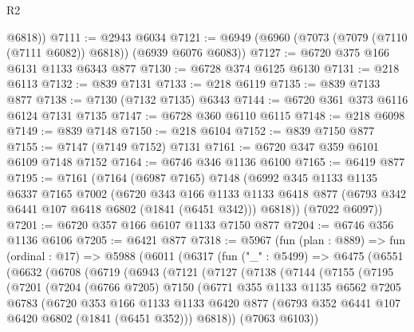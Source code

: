 \begin{lexlean}{R2}
\begin{coremodule}
        @6818))
@7111 := @2943 @6034
@7121 := @6949 (@6960 (@7073 (@7079 (@7110 (@7111 @6082)) @6818)) (@6939 @6076 @6083))
@7127 := @6720 @375 @166 @6131 @1133 @6343 @877
@7130 := @6728 @374 @6125 @6130
@7131 := @218 @6113
@7132 := @839 @7131
@7133 := @218 @6119
@7135 := @839 @7133 @877
@7138 := @7130 (@7132 @7135) @6343
@7144 := @6720 @361 @373 @6116 @6124 @7131 @7135
@7147 := @6728 @360 @6110 @6115
@7148 := @218 @6098
@7149 := @839 @7148
@7150 := @218 @6104
@7152 := @839 @7150 @877
@7155 := @7147 (@7149 @7152) @7131
@7161 := @6720 @347 @359 @6101 @6109 @7148 @7152
@7164 := @6746 @346 @1136 @6100
@7165 := @6419 @877
@7195 := @7161
    (@7164
      (@6987 @7165)
      @7148
      (@6992
        @345
        @1133
        @1135
        @6337
        @7165
        @7002
        (@6720
          @343
          @166
          @1133
          @1133
          @6418
          @877
          (@6793 @342 @6441 @107 @6418 @6802 (@1841 (@6451 @342)))
          @6818))
      (@7022 @6097))
@7201 := @6720 @357 @166 @6107 @1133 @7150 @877
@7204 := @6746 @356 @1136 @6106
@7205 := @6421 @877
@7318 := @5967
    (fun (plan : @889) =>
    fun (ordinal : @17) =>
    @5988
      (@6011
        (@6317
          (fun ("_" : @5499) =>
          @6475
            (@6551
              (@6632
                (@6708
                  (@6719
                    (@6943
                      (@7121
                        (@7127
                          (@7138
                            (@7144
                              (@7155
                                (@7195
                                  (@7201
                                    (@7204
                                      (@6766 @7205)
                                      @7150
                                      (@6771
                                        @355
                                        @1133
                                        @1135
                                        @6562
                                        @7205
                                        @6783
                                        (@6720
                                          @353
                                          @166
                                          @1133
                                          @1133
                                          @6420
                                          @877
                                          (@6793 @352 @6441 @107 @6420 @6802 (@1841 (@6451 @352)))
                                          @6818))
                                      (@7063 @6103))

\end{coremodule}
\end{lexlean}
